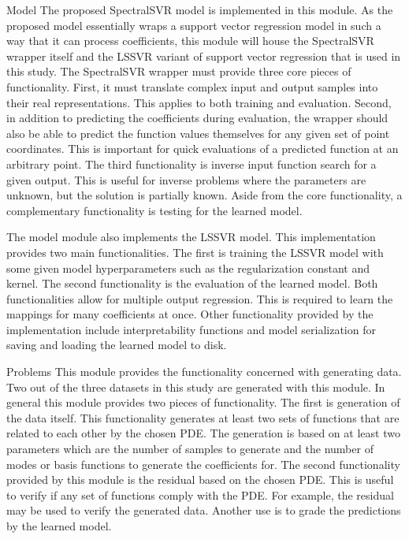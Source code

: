 \begin{numdesc}
  \item[Model]
  The proposed SpectralSVR model is implemented in this module. As the proposed model essentially wraps a support vector regression model in such a way that it can process coefficients, this module will house the SpectralSVR wrapper itself and the LSSVR variant of support vector regression that is used in this study. The SpectralSVR wrapper must provide three core pieces of functionality. First, it must translate complex input and output samples into their real representations. This applies to both training and evaluation. Second, in addition to predicting the coefficients during evaluation, the wrapper should also be able to predict the function values themselves for any given set of point coordinates. This is important for quick evaluations of a predicted function at an arbitrary point. The third functionality is inverse input function search for a given output. This is useful for inverse problems where the parameters are unknown, but the solution is partially known. Aside from the core functionality, a complementary functionality is testing for the learned model.

  The model module also implements the LSSVR model. This implementation provides two main functionalities. The first is training the LSSVR model with some given model hyperparameters such as the regularization constant and kernel. The second functionality is the evaluation of the learned model. Both functionalities allow for multiple output regression. This is required to learn the mappings for many coefficients at once. Other functionality provided by the implementation include interpretability functions and model serialization for saving and loading the learned model to disk.

  \item[Problems]
  This module provides the functionality concerned with generating data. Two out of the three datasets in this study are generated with this module. In general this module provides two pieces of functionality. The first is generation of the data itself. This functionality generates at least two sets of functions that are related to each other by the chosen PDE\@. The generation is based on at least two parameters which are the number of samples to generate and the number of modes or basis functions to generate the coefficients for. The second functionality provided by this module is the residual based on the chosen PDE\@. This is useful to verify if any set of functions comply with the PDE\@. For example, the residual may be used to verify the generated data. Another use is to grade the predictions by the learned model.

\end{numdesc}

